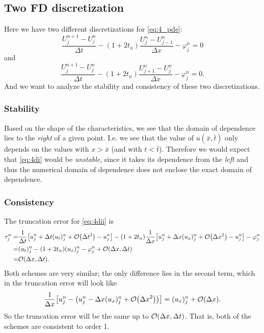 \documentclass[11pt,letter, swedish, english
]{article}
\newcommand{\Dx}{\ensuremath{\Delta{x}}}
\newcommand{\Dt}{\ensuremath{\Delta{t}}}
\begin{document}
\subsection{Two FD discretization}
Here we have two different discretizations for \eqref{eq:4_pde}:
\begin{equation}\label{eq:4di}
\frac{U_j^{n+1}-U_j^n}{\Dt} 
- (1+2t_n)\frac{U_j^n-U_{j-1}^n}{\Dx}
-\varphi_j^n = 0
\end{equation}
and
\begin{equation}\label{eq:4dii}
\frac{U_j^{n+1}-U_j^n}{\Dt} 
- (1+2t_n)\frac{U_{j+1}^n-U_{j}^n}{\Dx}
-\varphi_j^n = 0.
\end{equation}
And we want to analyze the stability and consistency of these two
discretizations. 

\subsubsection{Stability}
Based on the shape of the characteristics, we see that the domain of
dependence lies to the \emph{right} of a given point. I.e. we see that
the value of $u(\bar{x}, \bar{t})$ only depends on the values with
$x>\bar{x}$ (and with $t<\bar{t}$). 
Therefore we would expect that \eqref{eq:4di} would be
\emph{unstable}, since it takes its dependence from the \emph{left}
and thus the numerical domain of dependence does not enclose the exact
domain of dependence.

\subsubsection{Consistency}
The truncation error for \eqref{eq:4dii} is
\begin{equation}
\begin{aligned}
\tau_j^n =& 
\frac{1}{\Dt}\qty[u_j^n + \Dt(u_t)_j^n + \order{\Dt^2} - u_j^n]
-(1+2t_n)\frac{1}{\Dx}
\qty[u_j^n + \Dx(u_x)_j^n + \order{\Dx^2} - u_j^n] 
-\varphi_j^n\\
=& (u_t)_j^n -(1+2t_n)(u_x)_j^n -\varphi_j^n +\order{\Dx, \Dt}\\
=& \order{\Dx, \Dt}.
\end{aligned}
\end{equation}
Both schemes are very similar; the only difference lies in the second
term, which in the truncation error will look like
\begin{equation}
\frac{1}{\Dx}
\qty[u_j^n - \qty(u_j^n - \Dx(u_x)_j^n + \order{\Dx^2})]
= (u_x)_j^n + \order{\Dx}.
\end{equation}
So the truncation error will be the same up to $\order{\Dx, \Dt}$.
That is, both of the schemes are consistent to order 1.
\end{document}
